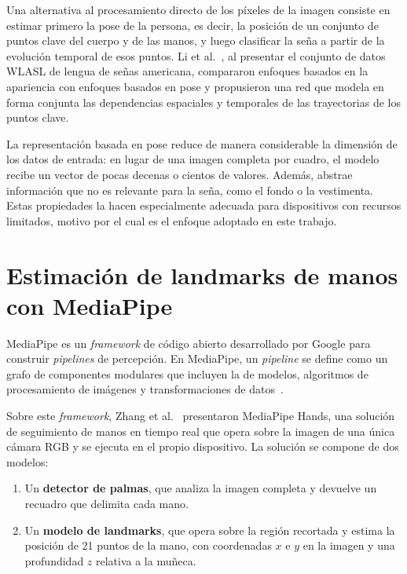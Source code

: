 Una alternativa al procesamiento directo de los píxeles de la imagen consiste en estimar primero la pose de la persona, es decir, la posición de un conjunto de puntos clave del cuerpo y de las manos, y luego clasificar la seña a partir de la evolución temporal de esos puntos. Li et al.~\cite{li2020wlasl}, al presentar el conjunto de datos WLASL de lengua de señas americana, compararon enfoques basados en la apariencia con enfoques basados en pose y propusieron una red que modela en forma conjunta las dependencias espaciales y temporales de las trayectorias de los puntos clave.

La representación basada en pose reduce de manera considerable la dimensión de los datos de entrada: en lugar de una imagen completa por cuadro, el modelo recibe un vector de pocas decenas o cientos de valores. Además, abstrae información que no es relevante para la seña, como el fondo o la vestimenta. Estas propiedades la hacen especialmente adecuada para dispositivos con recursos limitados, motivo por el cual es el enfoque adoptado en este trabajo.

\section{Estimación de landmarks de manos con MediaPipe}

MediaPipe es un \emph{framework} de código abierto desarrollado por Google para construir \emph{pipelines} de percepción. En MediaPipe, un \emph{pipeline} se define como un grafo de componentes modulares que incluyen la  de modelos, algoritmos de procesamiento de imágenes y transformaciones de datos~\cite{lugaresi2019mediapipe}.

Sobre este \emph{framework}, Zhang et al.~\cite{zhang2020mediapipehands} presentaron MediaPipe Hands, una solución de seguimiento de manos en tiempo real que opera sobre la imagen de una única cámara RGB y se ejecuta en el propio dispositivo. La solución se compone de dos modelos:

\begin{enumerate}
    \item Un \textbf{detector de palmas}, que analiza la imagen completa y devuelve un recuadro que delimita cada mano.
    \item Un \textbf{modelo de landmarks}, que opera sobre la región recortada y estima la posición de 21 puntos de la mano, con coordenadas $x$ e $y$ en la imagen y una profundidad $z$ relativa a la muñeca.
\end{enumerate}

